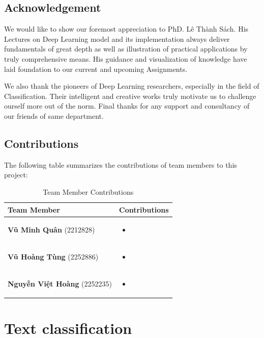 \documentclass[a4paper]{report}
\begin{document}
\newpage
\section*{Acknowledgement}
We would like to show our foremost appreciation to PhD. Lê Thành Sách. His Lectures on Deep Learning model and its implementation always deliver fundamentals of great depth as well as illustration of practical applications by truly comprehensive means. His guidance and visualization of knowledge have laid foundation to our current and upcoming Assignments.

We also thank the pioneers of Deep Learning researchers, especially in the field of Classification. Their intelligent and creative works truly motivate us to challenge ourself more out of the norm. Final thanks for any support and consultancy of our friends of same department.
\newpage
\section*{Contributions}
The following table summarizes the contributions of team members to this project:

\begin{table}[H]
\centering
\caption{Team Member Contributions}
\label{tab:contributions}
\begin{tabular}{|p{3.5cm}|p{10.5cm}|}
\hline
\textbf{Team Member} & \textbf{Contributions} \\ \hline
\textbf{Vũ Minh Quân} (2212828) &
\begin{itemize}
    \item 
\end{itemize} \\ \hline
\textbf{Vũ Hoàng Tùng} (2252886) &
\begin{itemize}
    \item 
\end{itemize} \\ \hline
\textbf{Nguyễn Việt Hoàng} (2252235) &
\begin{itemize}
    \item 
\end{itemize} \\ \hline
\end{tabular}
\end{table}

\newpage
\tableofcontents
\newpage

\chapter{Text classification}
\end{document}
